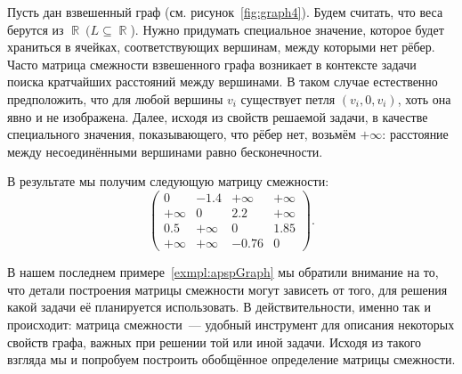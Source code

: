 \begin{marginfigure}
    \begin{center}
        \resizebox{\marginparwidth}{!}{}
    \end{center}
    \caption{Взвешенный граф}
    \label{fig:graph4}
\end{marginfigure}
\begin{example}
    \label{exmpl:apspGraph}
    Пусть дан взвешенный граф (см. рисунок~\ref{fig:graph4}).
    Будем считать, что веса берутся из $\BbbR \ (L \subseteq \BbbR$).
    Нужно придумать специальное значение, которое будет храниться в ячейках, соответствующих вершинам, между которыми нет рёбер.
    Часто матрица смежности взвешенного графа возникает в контексте задачи поиска кратчайших расстояний между вершинами.
    В таком случае естественно предположить, что для любой вершины $v_i$ существует петля $(v_i, 0, v_i)$, хоть она явно и не изображена.
    Далее, исходя из свойств решаемой задачи, в качестве специального значения, показывающего, что рёбер нет, возьмём $+\infty$: расстояние между несоединёнными вершинами равно бесконечности.

    В результате мы получим следующую матрицу смежности:
    \[
        \begin{pmatrix}
            0       & -1.4    & +\infty & +\infty \\
            +\infty & 0       & 2.2     & +\infty \\
            0.5     & +\infty & 0       & 1.85    \\
            +\infty & +\infty & -0.76   & 0
        \end{pmatrix}.
    \]
\end{example}

В нашем последнем примере~\ref{exmpl:apspGraph} мы обратили внимание на то, что детали построения матрицы смежности могут зависеть от того, для решения какой задачи её планируется использовать.
В действительности, именно так и происходит: матрица смежности~--- удобный инструмент для описания некоторых свойств графа, важных при решении той или иной задачи.
Исходя из такого взгляда мы и попробуем построить обобщённое определение матрицы смежности.

